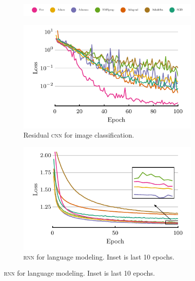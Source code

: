 \documentclass[preview,varwidth=7in,border=0mm]{standalone}
\begin{document}
\begin{figure}
    \centering
    \begin{subfigure}[t]{\textwidth}
        \centering
        \includegraphics[width=\textwidth]{optslegend.pdf}
    \end{subfigure}

    \hfill%
    \begin{subfigure}[t]{0.5\textwidth}
        \centering
        \includegraphics[width=\linewidth]{resnet.pdf}
        \caption{Residual \textsc{cnn} for image classification.}
    \end{subfigure}%
    \begin{subfigure}[t]{0.5\textwidth}
        \centering
        \includegraphics[width=\linewidth]{ptb.pdf}
        \caption{\textsc{rnn} for language modeling. Inset is last 10 epochs.}
    \end{subfigure}
    \hfill%
\end{figure}
\end{document}
